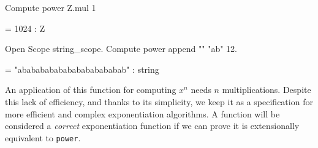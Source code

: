 \begin{Coqsrc}
Compute power Z.mul 1%
\end{Coqsrc}
\begin{Coqanswer}
   = 1024%
     : Z
\end{Coqanswer}

\begin{Coqsrc}
Open Scope string_scope.
Compute power append  "" "ab"  12.
\end{Coqsrc}
 
 
\begin{Coqanswer}
 = "abababababababababababab"
     : string
\end{Coqanswer}


An application of this function for  computing $x^n$ needs $n$ multiplications.
 Despite this lack of efficiency, and thanks to its simplicity, we keep it as a specification for more efficient and complex exponentiation algorithms.
A function will be considered a \emph{correct} exponentiation function if we can prove it is extensionally equivalent to \texttt{power}.










